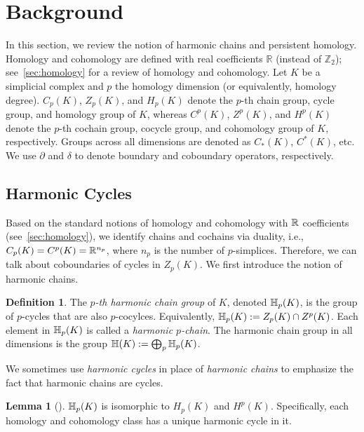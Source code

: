 \documentclass[10pt,a4paper]{amsart}
\newcommand {\mm}[1] {\ifmmode{#1}\else{\mbox{\(#1\)}}\fi}
\newcommand{\Rspace}        {\mm{\mathbb{R}}}
\newcommand{\har}           {\mm{\mathbb{H}}}
\theoremstyle{definition}
\newtheorem{lemma}[theorem]{Lemma}
\newtheorem{definition}[theorem]{Definition}
\theoremstyle{remark}
\begin{document}
\section{Background}
\label{sec:background}

In this section, we review the notion of harmonic chains and persistent homology. 
Homology and cohomology are defined with  real coefficients $\mathbb{R}$ (instead of $\mathbb{Z}_2$);
see~\cref{sec:homology} for a review of 
homology and cohomology.
Let $K$ be a simplicial complex and $p$ the homology dimension (or equivalently, homology degree). 
$C_p(K)$, $Z_p(K)$, and $H_p(K)$ denote the $p$-th chain group, cycle group, and homology group of $K$, whereas $C^p(K)$, $Z^p(K)$, and $H^p(K)$ denote the $p$-th cochain group, cocycle group, and cohomology group of $K$, respectively.
Groups across all dimensions are denoted as $C_*(K)$, $C^*(K)$, etc. 
We use $\partial$ and $\delta$ to denote boundary and coboundary operators, respectively. 

\subsection{Harmonic Cycles} 
Based on the standard notions of homology and cohomology  with $\Rspace$ coefficients (see~\cref{sec:homology}), we identify chains and cochains via duality, i.e.,~$C_p(K)= C^p(K)=\Rspace^{n_p}$, where $n_p$ is the number of $p$-simplices. 
Therefore, we can talk about coboundaries of cycles in $Z_p(K)$. 
We first introduce the notion of harmonic chains.  
\begin{definition}
\label{def:harmonic-cycle}
The \emph{$p$-th harmonic chain group} of $K$, denoted $\har_p(K)$, is the group of $p$-cycles that are also $p$-cocylces. 
Equivalently, $\har_p(K) := Z_p(K)\cap Z^p(K)$.
Each element in $\har_p(K)$ is called a \emph{harmonic $p$-chain}.
The harmonic chain group in all dimensions is the group $\har(K):=\bigoplus_p \har_p(K)$.
\end{definition}
We sometimes use \emph{harmonic cycles} in place of \emph{harmonic chains} to emphasize the fact that harmonic chains are cycles.

\begin{lemma}[\cite{Eckmann1944}]
\label{lem:har-homo-iso}
$\har_p(K)$ is isomorphic to $H_p(K)$ and $H^p(K)$. Specifically, each homology and cohomology class has a unique harmonic cycle in it.
\end{lemma}
\end{document}
